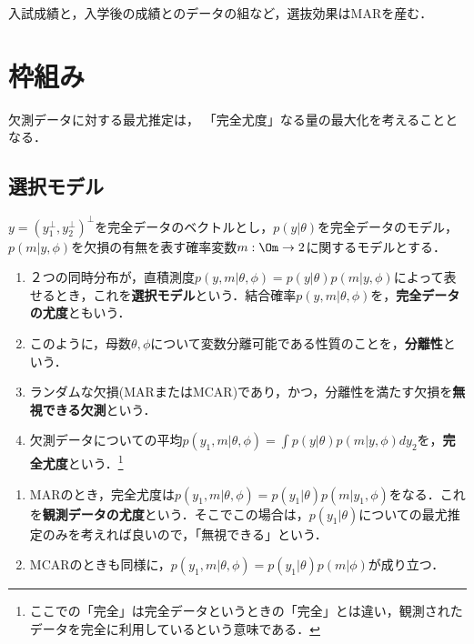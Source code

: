 \documentclass[uplatex,dvipdfmx]{jsreport}
\begin{document}
\begin{example}
    入試成績と，入学後の成績とのデータの組など，選抜効果はMARを産む．
\end{example}

\section{枠組み}

\begin{tcolorbox}[colframe=ForestGreen, colback=ForestGreen!10!white,breakable,colbacktitle=ForestGreen!40!white,coltitle=black,fonttitle=\bfseries\sffamily,
title=]
    欠測データに対する最尤推定は，
    「完全尤度」なる量の最大化を考えることとなる．
\end{tcolorbox}

\subsection{選択モデル}

\begin{definition}
    $y=(y_1^\perp,y^\perp_2)^\perp$を完全データのベクトルとし，$p(y|\theta)$を完全データのモデル，$p(m|y,\phi)$を欠損の有無を表す確率変数$m:\Om\to2$に関するモデルとする．
    \begin{enumerate}
        \item ２つの同時分布が，直積測度$p(y,m|\theta,\phi)=p(y|\theta)p(m|y,\phi)$によって表せるとき，これを\textbf{選択モデル}という．結合確率$p(y,m|\theta,\phi)$を，\textbf{完全データの尤度}ともいう．
        \item このように，母数$\theta,\phi$について変数分離可能である性質のことを，\textbf{分離性}という．
        \item ランダムな欠損(MARまたはMCAR)であり，かつ，分離性を満たす欠損を\textbf{無視できる欠測}という．
        \item 欠測データについての平均$p(y_1,m|\theta,\phi)=\int p(y|\theta)p(m|y,\phi)dy_2$を，\textbf{完全尤度}という．\footnote{ここでの「完全」は完全データというときの「完全」とは違い，観測されたデータを完全に利用しているという意味である．}
    \end{enumerate}
\end{definition}
\begin{remark}[無視できる欠測について]\mbox{}
    \begin{enumerate}
        \item MARのとき，完全尤度は$p(y_1,m|\theta,\phi)=p(y_1|\theta)p(m|y_1,\phi)$をなる．これを\textbf{観測データの尤度}という．そこでこの場合は，$p(y_1|\theta)$についての最尤推定のみを考えれば良いので，「無視できる」という．
        \item MCARのときも同様に，$p(y_1,m|\theta,\phi)=p(y_1|\theta)p(m|\phi)$が成り立つ．
    \end{enumerate}
\end{remark}
\end{document}
